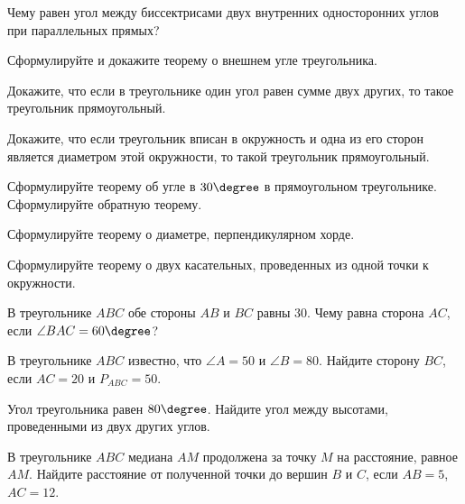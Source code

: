 \begin{listofex}
	\item
	\begin{enumcols}[itemcolumns=1]
		\item Чему равен угол между биссектрисами двух внутренних односторонних углов при параллельных прямых?
		\item Сформулируйте и докажите теорему о внешнем угле треугольника.
		\item Докажите, что если в треугольнике один угол равен сумме двух других, то такое треугольник прямоугольный.
		\item Докажите, что если треугольник вписан в окружность и одна из его сторон является диаметром этой окружности, то такой треугольник прямоугольный.
		\item Сформулируйте теорему об угле в \( 30\degree \) в прямоугольном треугольнике. Сформулируйте обратную теорему.
		\item Сформулируйте теорему о диаметре, перпендикулярном хорде.
		\item Сформулируйте теорему о двух касательных, проведенных из одной точки к окружности.
	\end{enumcols}
	\item В треугольнике \( ABC \) обе стороны \( AB \) и \( BC \) равны \( 30 \). Чему равна сторона \( AC \), если \( \angle BAC = 60 \degree \)?
	\item В треугольнике \( ABC \) известно, что \( \angle A = 50 \) и \( \angle B = 80 \). Найдите сторону \( BC \), если \( AC = 20 \) и \( P_{ABC}=50 \).
	\item Угол треугольника равен \( 80\degree \). Найдите угол между высотами, проведенными из двух других углов.
	\item {}
	\item {}
	\item В треугольнике \( ABC \) медиана \( AM \) продолжена за точку \( M \) на расстояние, равное \( AM \). Найдите расстояние от полученной точки до вершин \( B  \) и \( C\), если \( AB = 5\), \( AC = 12\).
	\item {}
\end{listofex}
%
